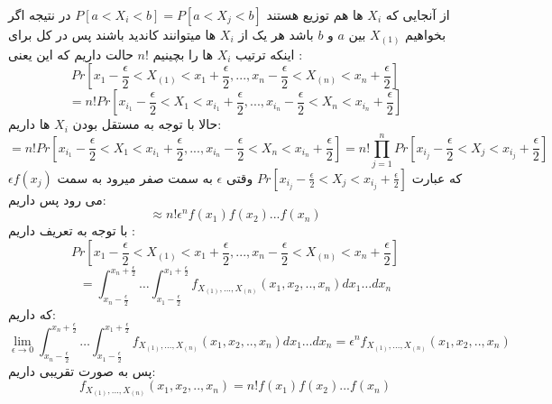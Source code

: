 \parte{}
از آنجایی که $X_i$ 
ها هم توزیع هستند $P[a<X_i<b] = P[a<X_j<b]$
در نتیجه اگر بخواهیم $X_{(1)}$ بین $a$ و $b$
باشد هر یک از $X_i$ ها میتوانند کاندید باشند پس
در کل برای اینکه ترتیب $X_i$ ها را بچینیم $n!$
حالت داریم که این یعنی :\\
\[
  Pr[x_1-\frac{\epsilon}{2}<X_{(1)}<x_1+\frac{\epsilon}{2},
  ...,
  x_n-\frac{\epsilon}{2}<X_{(n)}<x_n+\frac{\epsilon}{2}]  
\]
\[
  = n!Pr[x_{i_1}-\frac{\epsilon}{2}<X_{1}<x_{i_1}+\frac{\epsilon}{2},
  ...,
  x_{i_n}-\frac{\epsilon}{2}<X_{n}<x_{i_n}+\frac{\epsilon}{2}]  
\]
حالا با توجه به مستقل بودن $X_i$ ها داریم:\\

\[
  = n!Pr[x_{i_1}-\frac{\epsilon}{2}<X_{1}<x_{i_1}+\frac{\epsilon}{2},
  ...,
  x_{i_n}-\frac{\epsilon}{2}<X_{n}<x_{i_n}+\frac{\epsilon}{2}] 
  = n! \prod_{j=1}^{n}{Pr[x_{i_j} - \frac{\epsilon}{2} <X_j< x_{i_j} + \frac{\epsilon}{2}]}
\]
که عبارت $Pr[x_{i_j} - \frac{\epsilon}{2} <X_j< x_{i_j} + \frac{\epsilon}{2}]$
وقتی $\epsilon$
به سمت صفر میرود به سمت $\epsilon f(x_j)$ می رود
پس داریم:\\
\[
    \approx n!\epsilon^n f(x_1)f(x_2)...f(x_n)
\]
\parte{}
با توجه به تعریف داریم :\\
\[
    Pr[x_1-\frac{\epsilon}{2}<X_{(1)}<x_1+\frac{\epsilon}{2},
  ...,
  x_n-\frac{\epsilon}{2}<X_{(n)}<x_n+\frac{\epsilon}{2}]
\]
\[
    = \int_{x_n-\frac{\epsilon}{2}}^{x_n+\frac{\epsilon}{2}} 
    \dots
    \int_{x_1-\frac{\epsilon}{2}}^{x_1+\frac{\epsilon}{2}} 
    {f_{X_{(1)},...,X_{(n)}}(x_1,x_2,..,x_n)}
    dx_1 \dots dx_n
\]
که داریم:\\
\[
    \lim_{\epsilon \to 0}{
    \int_{x_n-\frac{\epsilon}{2}}^{x_n+\frac{\epsilon}{2}} 
    \dots
    \int_{x_1-\frac{\epsilon}{2}}^{x_1+\frac{\epsilon}{2}} 
    {f_{X_{(1)},...,X_{(n)}}(x_1,x_2,..,x_n)}
    dx_1 \dots dx_n
    }
    = \epsilon^n{f_{X_{(1)},...,X_{(n)}}(x_1,x_2,..,x_n)}
\]
پس به صورت تقریبی داریم:\\
\[
    {f_{X_{(1)},...,X_{(n)}}(x_1,x_2,..,x_n)} = n!f(x_1)f(x_2)...f(x_n)
\]